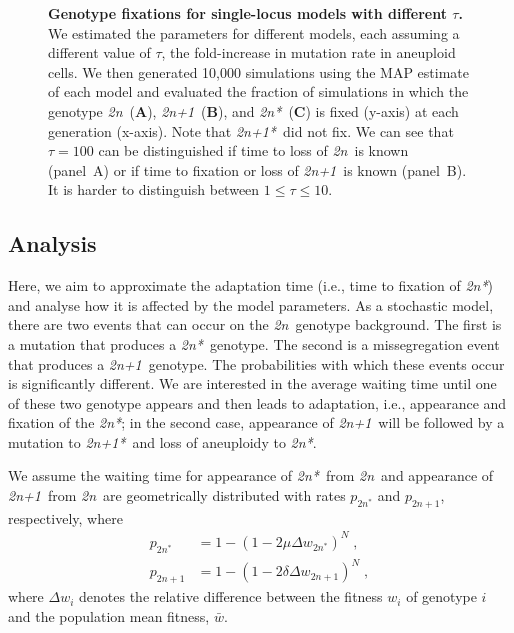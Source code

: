 \documentclass[12pt]{extarticle}
\newcommand{\euwt}{\emph{2n}}
\newcommand{\anwt}{\emph{2n+1}}
\newcommand{\eumt}{\emph{2n*}}
\newcommand{\anmt}{\emph{2n+1*}}
\begin{document}
\begin{figure}[p]
\begin{subfigure}{0.75\textwidth}
  \end{subfigure}
   \caption{
    \textbf{Genotype fixations for single-locus models with different $\tau$.} We estimated the parameters for different models, each assuming a different value of $\tau$, the fold-increase in mutation rate in aneuploid cells. We then generated 10,000 simulations using the MAP estimate of each model and evaluated the fraction of simulations in which the genotype \euwt\ (\textbf{A}), \anwt\ (\textbf{B}), and \eumt\ (\textbf{C}) is fixed (y-axis) at each generation (x-axis). Note that \anmt\ did not fix. We can see that $\tau=100$ can be distinguished if time to loss of \euwt\ is known (panel~A) or if time to fixation or loss of \anwt\ is known (panel~B). It is harder to distinguish between $1\leq \tau \leq10$.
  }
  \label{fig:tau-plots}
\end{figure}


\pagebreak
\subsection*{Analysis}

Here, we aim to approximate the adaptation time (i.e., time to fixation of \eumt) and analyse how it is affected by the model parameters.
As a stochastic model, there are two events that can occur on the \euwt\ genotype background. The first is a mutation that produces a \eumt\ genotype. The second is a missegregation event that produces a \anwt\ genotype. The probabilities with which these events occur is significantly different. We are interested in the average waiting time until one of these two genotype appears and then leads to adaptation, i.e., appearance and fixation of the \eumt; in the second case, appearance of \anwt\ will be followed by a mutation to \anmt\ and loss of aneuploidy to \eumt.

We assume the waiting time for appearance of \eumt\ from \euwt\ and appearance of \anwt\ from \euwt\ are geometrically distributed with rates $p_{2n^*}$ and $p_{2n+1}$, respectively, where
\begin{subequations}
\begin{align}
p_{2n^*} &= 1-(1-2\mu \Delta w_{2n^*})^N \;, \\
p_{2n+1} &= 1-(1-2\delta\Delta w_{2n+1})^N \;,
\end{align}
\end{subequations}
where $\Delta w_i$ denotes the relative difference between the fitness $w_i$ of genotype $i$ and the population mean fitness, $\bar{w}$.
\end{document}
